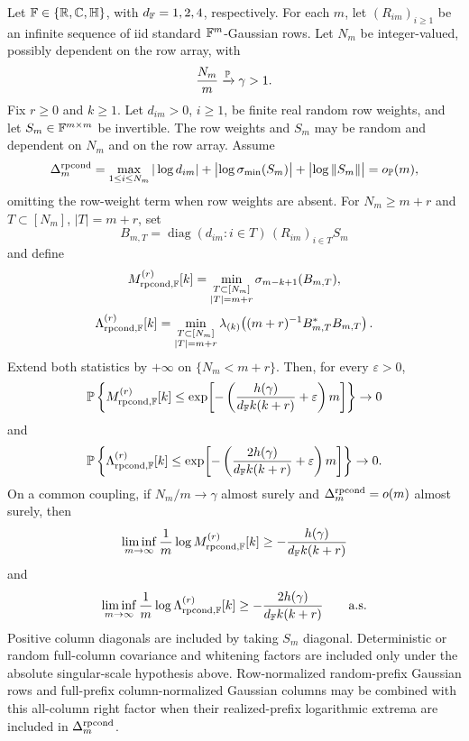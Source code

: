 \begin{corollary}\label{cor:random-prefix-right-factor-fixed-excess-fixed-k-lower}
Let \(\mathbb{F}\in\{\mathbb{R},\mathbb{C},\mathbb{H}\}\), with \(d_{\mathbb{F}}=1,2,4\), respectively.  For each
\(m\), let \((R_{im})_{i\ge1}\) be an infinite sequence of iid standard
\(\mathbb{F}^m\)-Gaussian rows.  Let \(N_m\) be integer-valued, possibly dependent on
the row array, with
\[
  \frac{N_m}{m}\xrightarrow{\mathbb{P}}\gamma>1 .
\]
Fix \(r\ge0\) and \(k\ge1\).  Let \(d_{im}>0\), \(i\ge1\), be finite real
random row weights, and let \(S_m\in\mathbb{F}^{m\times m}\) be invertible.  The row
weights and \(S_m\) may be random and dependent on \(N_m\) and on the row array.
Assume
\[
  \Delta_m^{\rm rpcond}
  =
  \max_{1\le i\le N_m}|\log d_{im}|
  +\bigl|\log\sigma_{\min}(S_m)\bigr|+\bigl|\log\|S_m\|\bigr|
  =o_{\mathbb{P}}(m),
\]
omitting the row-weight term when row weights are absent.  For \(N_m\ge m+r\)
and \(T\subset[N_m]\), \(|T|=m+r\), set
\[
  B_{m,T}=\operatorname{diag}(d_{im}:i\in T)\,(R_{im})_{i\in T}S_m
\]
and define
\[
  M_{\rm rpcond,\mathbb{F}}^{(r)}[k]
  =
  \min_{\substack{T\subset[N_m]\\ |T|=m+r}}\sigma_{m-k+1}(B_{m,T}),
\]
\[
  \Lambda_{\rm rpcond,\mathbb{F}}^{(r)}[k]
  =
  \min_{\substack{T\subset[N_m]\\ |T|=m+r}}
  \lambda_{(k)}\!\left((m+r)^{-1}B_{m,T}^*B_{m,T}\right).
\]
Extend both statistics by \(+\infty\) on \(\{N_m<m+r\}\).  Then, for every
\(\varepsilon>0\),
\[
  \mathbb{P}\left\{M_{\rm rpcond,\mathbb{F}}^{(r)}[k]\le
  \exp\!\left[-\left(\frac{h(\gamma)}{d_{\mathbb{F}} k(k+r)}
    +\varepsilon\right)m\right]\right\}\to0
\]
and
\[
  \mathbb{P}\left\{\Lambda_{\rm rpcond,\mathbb{F}}^{(r)}[k]\le
  \exp\!\left[-\left(\frac{2h(\gamma)}{d_{\mathbb{F}} k(k+r)}
    +\varepsilon\right)m\right]\right\}\to0.
\]
On a common coupling, if \(N_m/m\to\gamma\) almost surely and
\(\Delta_m^{\rm rpcond}=o(m)\) almost surely, then
\[
  \liminf_{m\to\infty}\frac1m\log M_{\rm rpcond,\mathbb{F}}^{(r)}[k]
  \ge -\frac{h(\gamma)}{d_{\mathbb{F}} k(k+r)}
\]
and
\[
  \liminf_{m\to\infty}\frac1m\log \Lambda_{\rm rpcond,\mathbb{F}}^{(r)}[k]
  \ge -\frac{2h(\gamma)}{d_{\mathbb{F}} k(k+r)}
  \qquad\hbox{a.s.}
\]
Positive column diagonals are included by taking \(S_m\) diagonal.  Deterministic
or random full-column covariance and whitening factors are included only under
the absolute singular-scale hypothesis above.  Row-normalized random-prefix
Gaussian rows and full-prefix column-normalized Gaussian columns may be combined
with this all-column right factor when their realized-prefix logarithmic extrema
are included in \(\Delta_m^{\rm rpcond}\).
\end{corollary}

